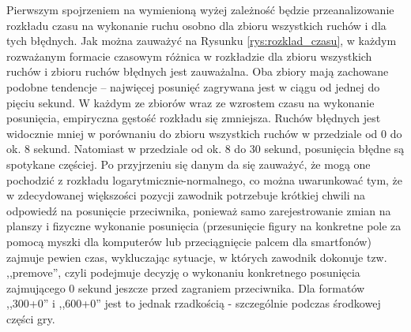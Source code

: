 \documentclass[inzynierska]{pwr_wmat_praca_dyplomowa}
\theoremstyle{plain}
\numberwithin{theorem}{chapter}
\theoremstyle{definition}
\numberwithin{theorem}{chapter}
\begin{document}
Pierwszym spojrzeniem na wymienioną wyżej zależność będzie przeanalizowanie rozkładu czasu na wykonanie ruchu osobno dla zbioru wszystkich ruchów i dla tych błędnych. Jak można zauważyć na Rysunku \ref{rys:rozklad_czasu}, w każdym rozważanym formacie czasowym różnica w rozkładzie dla zbioru wszystkich ruchów i zbioru ruchów błędnych jest zauważalna. Oba zbiory mają zachowane podobne tendencje -- najwięcej posunięć zagrywana jest w ciągu od jednej do pięciu sekund. W każdym ze zbiorów wraz ze wzrostem czasu na wykonanie posunięcia, empiryczna gęstość rozkładu się zmniejsza. Ruchów błędnych jest widocznie mniej w porównaniu do zbioru wszystkich ruchów w przedziale od 0 do ok. 8 sekund. Natomiast w przedziale od ok. 8 do 30 sekund, posunięcia błędne są spotykane częściej.
Po przyjrzeniu się danym da się zauważyć, że mogą one pochodzić z rozkładu logarytmicznie-normalnego, co można uwarunkować tym, że w zdecydowanej większości pozycji zawodnik potrzebuje krótkiej chwili na odpowiedź na posunięcie przeciwnika, ponieważ samo zarejestrowanie zmian na planszy i fizyczne wykonanie posunięcia (przesunięcie figury na konkretne pole za pomocą myszki dla komputerów lub przeciągnięcie palcem dla smartfonów) zajmuje pewien czas, wykluczając sytuacje, w których zawodnik dokonuje tzw. ,,premove'', czyli podejmuje decyzję o wykonaniu konkretnego posunięcia zajmującego 0 sekund jeszcze przed zagraniem przeciwnika. Dla formatów ,,300+0'' i ,,600+0'' jest to jednak rzadkością - szczególnie podczas środkowej części gry.
\end{document}
